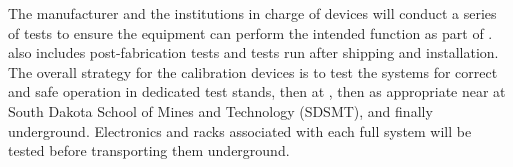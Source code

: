 
The manufacturer and the institutions in charge of devices will conduct a series of tests to ensure the equipment can perform the intended function as part of .  also includes post-fabrication tests and tests run after shipping and installation. The overall strategy for the calibration devices is to test the systems for correct and safe operation in dedicated test stands, then at , then as appropriate near  at South Dakota School of Mines and Technology (SDSMT),
and finally underground. Electronics and racks associated with each full system will be tested before transporting them underground.

